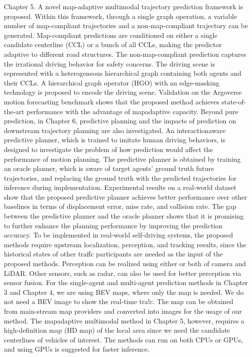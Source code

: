 Chapter 5. A novel map-adaptive multimodal trajectory prediction framework is
proposed. Within this framework, through a single graph operation, a variable
number of map-compliant trajectories and a non-map-compliant trajectory can be
generated. Map-compliant predictions are conditioned on either a single candidate
centerline (CCL) or a bunch of all CCLs, making the predictor adaptive to different
road structures. The non-map-compliant prediction captures the irrational driving
behavior for safety concerns. The driving scene is represented with a heterogeneous
hierarchical graph containing both agents and their CCLs. A hierarchical graph
operator (HGO) with an edge-masking technology is proposed to encode the driving
scene. Validation on the Argoverse motion forecasting benchmark shows that the
proposed method achieves state-of-the-art performance with the advantage of mapadaptive capacity.
Beyond pure prediction, in Chapter 6, predictive planning and the impacts of prediction on downstream trajectory planning are also investigated. An interactionaware predictive planner, which is trained to imitate human driving behaviors,
is designed to investigate the problem of how prediction would affect the performance of motion planning. The predictive planner is obtained by training an
oracle planner, which is aware of target agents’ ground truth future trajectories,
and replacing the ground truth with the predicted trajectories for inference during
implementation. Experimental results on a real-world dataset show that the proposed predictive planner achieves better performance over other baselines in terms
of displacement error, miss rate, and collision rate. The gap between the predictive
planner and the oracle planner shows that it is promising to further enhance the
planning performance by improving the prediction accuracy.
To be implemented in real-world self-driving systems, the proposed methods require upstream localization, perception, and tracking results, since the historical
states of other traffc participants are needed as the input of the proposed methods. Perception can be realized using either or both of camera and LiDAR. Other
sensors, such as radar, can also be used for better perception via sensor fusion. For
the single-agent and multi-agent prediction methods in Chapter 3 and Chapter 4,
we are using BEV maps, where only the map is needed. We do not need a BEV
image to show the real-time tra!c. The map can be obtained from main-stream
map providers and converted into images for the usage of our method. The mapadaptive multimodal method in Chapter 5, however, requires a high-definition map
(HD map) of the local area since we need the candidate centerlines of vehicles of interest. The methods can run on both CPUs or GPUs, and using GPUs is suggested
for faster inference.

